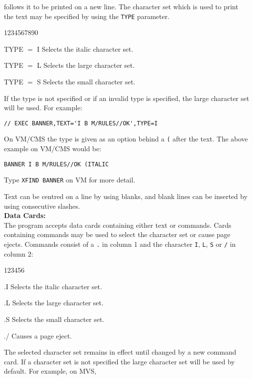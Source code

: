 follows it to be printed on a new line. The character set which is used
to print the text may be specified by using the {\tt TYPE} parameter.
\begin{DLtt}{1234567890}
\item [TYPE $=$ I] Selects the italic character set.
\item [TYPE $=$ L] Selects the large character set.
\item [TYPE $=$ S] Selects the small character set.
\end{DLtt}
If the type is not specified or if an invalid type is
specified, the large character set will be used. For example:
\begin{verbatim}
// EXEC BANNER,TEXT='I B M/RULES//OK',TYPE=I
\end{verbatim}
\newpage
On VM/CMS the type is given as an option behind a {\tt (} after the
text. The above example on VM/CMS would be:
\begin{verbatim}
BANNER I B M/RULES//OK (ITALIC
\end{verbatim}
Type {\tt XFIND BANNER} on VM for more detail.
\par
Text can be centred on a line by using blanks, and blank lines can
be inserted by using consecutive slashes. \\[3mm]
{\bf Data Cards:} \\[2mm]
The program accepts data cards containing either text or
commands. Cards containing commands may be used to select the
character set or cause page ejects. Commands consist of a {\tt .} in
column 1 and the character {\tt I}, {\tt L}, {\tt S} or {\tt /} in
column 2:
\begin{DLtt}{123456}
\item[.I]   Selects the italic character set.
\item[.L]   Selects the large character set.
\item[.S]   Selects the small character set.
\item[./]   Causes a page eject.
\end{DLtt}
The selected character set remains in effect until changed by a new
command card. If a character set is not specified the large character
set will be used by default. For example, on MVS, \\[3mm]
